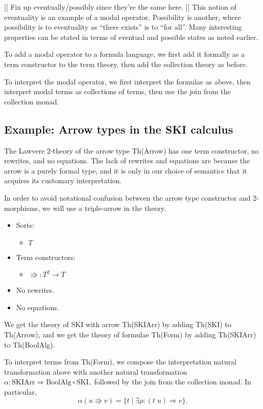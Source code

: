 \documentclass{article}
\newcommand{\maps}{\colon}
\begin{document}
[[ Fix up eventually/possibly since they're the same here. ]] This notion of eventuality is an example of a modal operator.  Possibility is another, where possibility is to eventuality as ``there exists'' is to ``for all''.  Many interesting properties can be stated in terms of eventual and possible states as noted earlier.

To add a modal operator to a formula language, we first add it formally as a term constructor to the term theory, then add the collection theory as before.  

To interpret the modal operator, we first interpret the formulae as above, then interpret modal terms as collections of terms, then use the join from the collection monad.

\subsection{Example: Arrow types in the SKI calculus}

The Lawvere 2-theory of the arrow type Th(Arrow) has one term constructor, no rewrites, and no equations.  The lack of rewrites and equations are because the arrow is a purely formal type, and it is only in our choice of semantics that it acquires its customary interpretation.

In order to avoid notational confusion between the arrow type constructor and 2-morphisms, we will use a triple-arrow in the theory.
\begin{itemize}
  \item Sorts:
  \begin{itemize}
    \item $T$
  \end{itemize}
  \item Term constructors:
    \begin{itemize}
      \item $\Rrightarrow \maps T^2 \to T$
    \end{itemize}
  \item No rewrites.
  \item No equations.
\end{itemize}

We get the theory of SKI with arrow Th(SKIArr) by adding Th(SKI) to Th(Arrow), and we get the theory of formulae Th(Form) by adding Th(SKIArr) to Th(BoolAlg).

To interpret terms from Th(Form), we compose the interpretation natural transformation above with another natural transformation $\alpha\maps \mathrm{SKIArr} \Rightarrow \mathrm{BoolAlg} \circ \mathrm{SKI},$ followed by the join from the collection monad.  In particular, 
\[ \alpha(u \Rrightarrow v) = \{ t \;|\; \exists \rho\maps (t\; u) \Rightarrow v \}. \]
\end{document}
